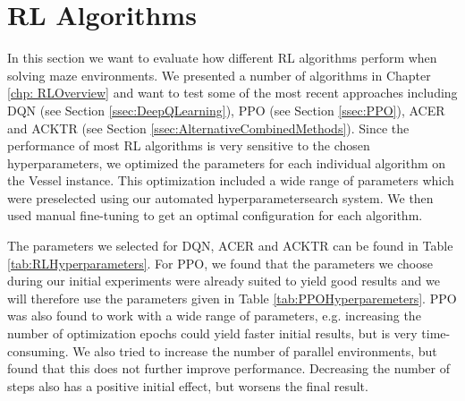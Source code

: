 \section{RL Algorithms} \label{sec:EvalRLAlgorithms}
In this section we want to evaluate how different RL algorithms perform when solving maze environments. We presented a number of algorithms in Chapter \ref{chp: RLOverview} and want to test some of the most recent approaches including DQN (see Section \ref{ssec:DeepQLearning}), PPO (see Section \ref{ssec:PPO}), ACER and ACKTR (see Section \ref{ssec:AlternativeCombinedMethods}). Since the performance of most RL algorithms is very sensitive to the chosen hyperparameters, we optimized the parameters for each individual algorithm on the Vessel instance. This optimization included a wide range of parameters which were preselected using our automated hyperparametersearch system. We then used manual fine-tuning to get an optimal configuration for each algorithm. 

The parameters we selected for DQN, ACER and ACKTR can be found in Table \ref{tab:RLHyperparameters}. For PPO, we found that the parameters we choose during our initial experiments were already suited to yield good results and we will therefore use the parameters given in Table \ref{tab:PPOHyperparemeters}. PPO was also found to work with a wide range of parameters, e.g. increasing the number of optimization epochs could yield faster initial results, but is very time-consuming. We also tried to increase the number of parallel environments, but found that this does not further improve performance.  Decreasing the number of steps also has a positive initial effect, but worsens the final result.

